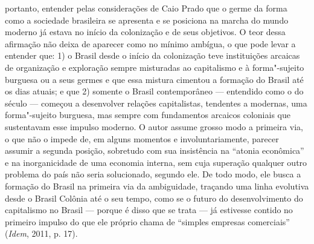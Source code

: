 portanto, entender pelas considerações de Caio Prado que o germe da
forma como a sociedade brasileira se apresenta e se posiciona na marcha
do mundo moderno já estava no início da colonização e de seus objetivos.
O teor dessa afirmação não deixa de aparecer como no mínimo ambígua, o
que pode levar a entender que: 1) o Brasil desde o início da colonização
teve instituições arcaicas de organização e exploração sempre misturadas
ao capitalismo e à forma"-sujeito burguesa ou a seus germes e que essa
mistura cimentou a formação do Brasil até os dias atuais; e que 2)
somente o Brasil contemporâneo --- entendido como o do século  ---
começou a desenvolver relações capitalistas, tendentes a modernas, uma
forma"-sujeito burguesa, mas sempre com fundamentos arcaicos coloniais
que sustentavam esse impulso moderno. O autor assume grosso modo a
primeira via, o que não o impede de, em alguns momentos e
involuntariamente, parecer assumir a segunda posição, sobretudo com sua
insistência na ``atonia econômica'' e na inorganicidade de uma economia
interna, sem cuja superação qualquer outro problema do país não seria
solucionado, segundo ele. De todo modo, ele busca a formação do Brasil
na primeira via da ambiguidade, traçando uma linha evolutiva desde o
Brasil Colônia até o seu tempo, como se o futuro do desenvolvimento do
capitalismo no Brasil --- porque é disso que se trata --- já estivesse
contido no primeiro impulso do que ele próprio chama de ``simples
empresas comerciais'' (\emph{Idem}, 2011, p. 17).


